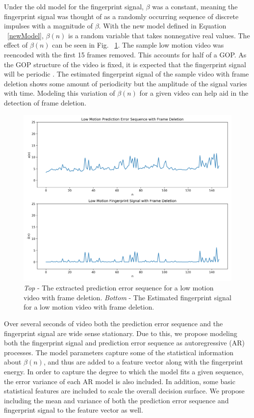 Under the old model for the fingerprint signal, $\beta$ was a constant, meaning the fingerprint signal was thought of as a randomly occurring sequence of discrete impulses with a magnitude of $\beta$. With the new model defined in Equation ~\ref{newModel}, $\beta(n)$ is a random variable that takes nonnegative real values. The effect of $\beta(n)$ can be seen in Fig. ~\ref{fdelCompare}. The sample low motion video was reencoded with the first 15 frames removed. This accounts for half of a GOP. As the GOP structure of the video is fixed, it is expected that the fingerprint signal will be periodic \cite{stamm}. The estimated fingerprint signal of the sample video with frame deletion shows some amount of periodicity but the amplitude of the signal varies with time. Modeling this variation of $\beta(n)$ for a given video can help aid in the detection of frame deletion.

\begin{figure}[htbp]
\centerline{\includegraphics[width=0.75\linewidth]{ProposedApproach/perror_fdel_comparison.png}}
\caption{\emph{Top} - The extracted prediction error sequence for a low motion video with frame deletion. \emph{Bottom} - The Estimated fingerprint signal for a low motion video with frame deletion.}
\label{fdelCompare}
\end{figure}

Over several seconds of video both the prediction error sequence and the fingerprint signal are wide sense stationary. Due to this, we propose modeling both the fingerprint signal and prediction error sequence as autoregressive (AR) processes. The model parameters capture some of the statistical information about $\beta(n)$, and thus are added to a feature vector along with the fingerprint energy. In order to capture the degree to which the model fits a given sequence, the error variance of each AR model is also included. In addition, some basic statistical features are included to scale the overall decision surface. We propose including the mean and variance of both the prediction error sequence and fingerprint signal to the feature vector as well.

